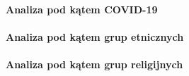 \documentclass[11pt]{report}
\begin{document}
    \paragraph{Analiza pod kątem COVID-19}

    \paragraph{Analiza pod kątem grup etnicznych}

    \paragraph{Analiza pod kątem grup religijnych}



    \newpage
    \printbibliography[title={Bibliografia}]
\end{document}
